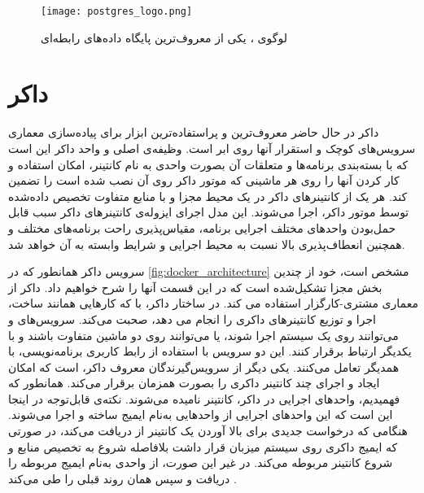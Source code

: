 \begin{figure}[!h]
\centerline{\texttt{[image: postgres\_logo.png]}}
\caption{لوگوی ، یکی از معروف‌ترین پایگاه داده‌های رابطه‌ای\cite{postgresqlPostgreSQL}}
\label{fig:postgres_logo}
\end{figure}

\section{داکر}
داکر در حال حاضر معروف‌ترین و پراستفاده‌ترین ابزار برای پیاده‌سازی معماری سرویس‌های کوچک و استقرار آنها روی ابر است.  وظیفه‌ی اصلی و واحد داکر این است که با بسته‌بندی برنامه‌ها و متعلقات آن بصورت واحدی به نام کانتینر، امکان استفاده و کار کردن آنها را روی هر ماشینی که موتور داکر روی آن نصب شده است را تضمین کند. هر یک از کانتینرهای داکر در یک محیط مجزا و با منابع متفاوت تخصیص داده‌شده توسط موتور داکر، اجرا می‌شوند. این مدل اجرای ایزوله‌ی کانتینرهای داکر سبب قابل حمل‌بودن واحدهای مختلف اجرایی برنامه، مقیاس‌پذیری راحت برنامه‌های مختلف و همچنین انعطاف‌پذیری بالا نسبت به محیط اجرایی و شرایط وابسته به آن خواهد شد\cite{anderson2015docker, dockerDockerOverview}.

سرویس داکر همانطور که در \cref{fig:docker_architecture}\cite{dockerDockerOverview} مشخص است، خود از چندین بخش مجزا تشکیل‌شده است که در این قسمت آنها را شرح 
خواهیم داد. داکر از معماری مشتری-کارگزار استفاده می کند. در ساختار داکر،  با  که کارهایی همانند ساخت، اجرا و توزیع کانتینرهای داکری را انجام می دهد، صحبت می‌کند. سرویس‌های  و  می‌توانند روی یک سیستم اجرا شوند، یا می‌توانند روی دو ماشین متفاوت باشند و با یکدیگر ارتباط برقرار کنند. این دو سرویس با استفاده از رابط کاربری برنامه‌نویسی، با همدیگر تعامل می‌کنند. یکی دیگر از سرویس‌گیرندگان معروف داکر،  است که امکان ایجاد و اجرای چند کانتینر داکری را بصورت همزمان برقرار می‌کند. همانطور که فهمیدیم، واحد‌های اجرایی در داکر، کانتینر نامیده می‌شوند. نکته‌ی قابل‌توجه در اینجا این است که این واحد‌های اجرایی از واحد‌هایی به‌نام ایمیج ساخته و اجرا می‌شوند. هنگامی که  درخواست جدیدی برای بالا آوردن یک کانتینر از  دریافت می‌کند، در صورتی که ایمیج داکری روی سیستم میزبان قرار داشت بلافاصله شروع به تخصیص منابع و شروع کانتینر مربوطه می‌کند. در غیر این صورت، از واحدی به‌نام  ایمیج مربوطه را دریافت و سپس همان روند قبلی را طی می‌کند \cite{dockerDockerOverview}.

